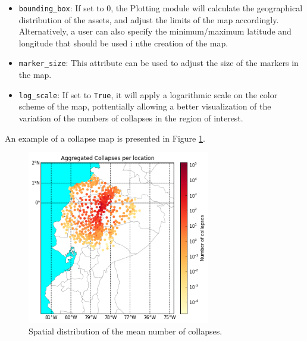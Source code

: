 \begin{itemize}
\item \verb=bounding_box=: If set to 0, the Plotting module will calculate the geographical distribution of the assets, and adjust the limits of the map accordingly. Alternatively, a user can also specify the minimum/maximum latitude and longitude that should be used i nthe creation of the map.
\item \verb=marker_size=: This attribute can be used to adjust the size of the markers in the map.
\item \verb=log_scale=: If set to \verb=True=, it will apply a logarithmic scale on the color scheme of the map, pottentially allowing a better visualization of the variation of the numbers of collapses in the region of interest.\\
\end{itemize}

An example of a collapse map is presented in Figure \ref{fig:collapse_map}.

\begin{figure}[htb]
  \centering
      \includegraphics[width=8cm]{figures/collapse_map.png}
  \caption{Spatial distribution of the mean number of collapses.}
  \label{fig:collapse_map}
\end{figure}

